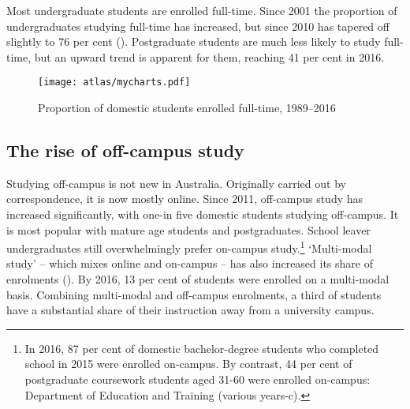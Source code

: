 \documentclass{grattan}
\begin{document}
Most undergraduate students are enrolled full-time. Since 2001 the proportion of undergraduates studying full-time has increased, but since 2010 has tapered off slightly to 76 per cent (). Postgraduate students are much less likely to study full-time, but an upward trend is apparent for them, reaching 41 per cent in 2016.


    \begin{figure} %
    \caption{Proportion of domestic students enrolled full-time, 1989--2016}\label{fig:proportion-of-domestic-students-enrolled-fulltime-19892016}
    \texttt{[image: atlas/mycharts.pdf]}
    \end{figure}



%
\subsection{The rise of off-campus study}\label{subsec:the-rise-of-off-campus-study}

Studying off-campus is not new in Australia. Originally carried out by correspondence, it is now mostly online. Since 2011, off-campus study has increased significantly, with one-in five domestic students studying off-campus. It is most popular with mature age students and postgraduates. School leaver undergraduates still overwhelmingly prefer on-campus study.\footnote{In 2016, 87 per cent of domestic bachelor-degree students who completed school in 2015 were enrolled on-campus. By contrast, 44 per cent of postgraduate coursework students aged 31-60 were enrolled on-campus: Department of Education and Training (various years-c).} `Multi-modal study' -- which mixes online and on-campus -- has also increased its share of enrolments (). By 2016, 13 per cent of students were enrolled on a multi-modal basis. Combining multi-modal and off-campus enrolments, a third of students have a substantial share of their instruction away from a university campus.
\end{document}
